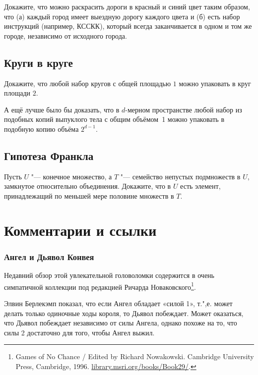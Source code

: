\documentclass[twoside]{book}
\makeatletter
\newcommand{\rindex}[2][\imki@jobname]{%
  \index[#1]{\detokenize{#2}}%
}
\makeatother
\begin{document}
Докажите, что можно раскрасить дороги в красный и синий цвет таким образом, что (а) каждый город имеет выездную дорогу каждого цвета и (б) есть набор инструкций (например, КССКК), который всегда заканчивается в одном и том же городе, независимо от исходного города.

\subsection*{Круги в круге}
\rindex{Круги в круге}

Докажите, что любой набор кругов с общей площадью $1$ можно упаковать в круг площади $2$.

А ещё лучше было бы доказать, что в $d$-мерном пространстве любой набор из подобных копий выпуклого тела с общим объёмом~1 можно упаковать в подобную копию объёма $2^{d-1}$.

\subsection*{Гипотеза Франкла}
\rindex{Гипотеза Франкла}

Пусть $U$ "--- конечное множество, а $T$ "--- семейство непустых подмножеств в $U$, замкнутое относительно объединения.
Докажите, что в $U$ есть элемент, принадлежащий по меньшей мере половине множеств в $T$.


\section*{Комментарии и ссылки}

\subsubsection*{Ангел и Дьявол Конвея}

Недавний обзор этой увлекательной головоломки содержится в очень симпатичной коллекции под редакцией Ричарда Новаковского\footnote{{Games of No Chance} / Edited by Richard Nowakowski. Cambridge University Press, Cambridge, 1996. \href{http://library.msri.org/books/Book29/}{\url{library.msri.org/books/Book29/}}.}. 

Элвин Берлекэмп показал, что если Ангел обладает «силой 1», т.",е. может делать только одиночные ходы короля, то Дьявол побеждает.
Может оказаться, что Дьявол побеждает независимо от силы Ангела,
однако похоже на то, что силы 2 достаточно для того, чтобы Ангел выжил.
\end{document}
